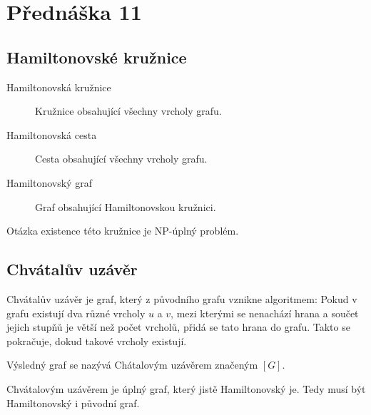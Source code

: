 \section{Přednáška 11}

\subsection{Hamiltonovské kružnice}

\begin{description}
    \item[Hamiltonovská kružnice] Kružnice obsahující všechny vrcholy grafu.
    \item[Hamiltonovská cesta] Cesta obsahující všechny vrcholy grafu.
    \item[Hamiltonovský graf] Graf obsahující Hamiltonovskou kružnici.
\end{description}

Otázka existence této kružnice je NP-úplný problém.

\subsection{Chvátalův uzávěr}


Chvátalův uzávěr je graf, který z původního grafu vznikne algoritmem:
Pokud v grafu existují dva různé vrcholy $u$ a $v$, mezi kterými se nenachází hrana a součet jejich stupňů je větší než počet vrcholů, přidá se tato hrana do grafu.
Takto se pokračuje, dokud takové vrcholy existují.

Výsledný graf se nazývá Chátalovým uzávěrem značeným $[G]$.



Chvátalovým uzávěrem je úplný graf, který jistě Hamiltonovský je.
Tedy musí být Hamiltonovský i původní graf.

